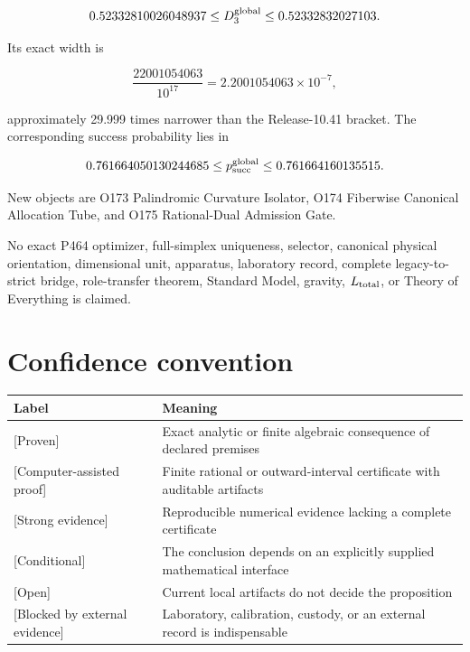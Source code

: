 \documentclass[11pt,a4paper,openany]{report}
\newcommand{\statusProven}{\textcolor{fingreen}{[Proven]}}
\newcommand{\statusStrong}{\textcolor{finblue}{[Strong evidence]}}
\begin{document}
\begin{enumerate}
\[
   0.52332810026048937\le D_3^{\rm global}
   \le0.52332832027103.
   \]

Its exact width is

\[
   \frac{22001054063}{10^{17}}=2.2001054063\times10^{-7},
   \]

approximately 29.999 times narrower than the Release-10.41 bracket. The corresponding success probability lies in

\[
   0.761664050130244685\le p_{\rm succ}^{\rm global}
   \le0.761664160135515.
   \]

\end{enumerate}

New objects are O173 Palindromic Curvature Isolator, O174 Fiberwise Canonical Allocation Tube, and O175 Rational-Dual Admission Gate.

No exact P464 optimizer, full-simplex uniqueness, selector, canonical physical orientation, dimensional unit, apparatus, laboratory record, complete legacy-to-strict bridge, role-transfer theorem, Standard Model, gravity, \(L_{\rm total}\), or Theory of Everything is claimed.

\chapter{Confidence convention}

\begin{center}
\begingroup\small
\setlength{\tabcolsep}{2.5pt}
\renewcommand{\arraystretch}{1.16}
\begin{longtable}{@{}p{}p{}@{}}
\toprule
\textbf{Label} & \textbf{Meaning} \\
\midrule
\endhead
\statusProven{} & Exact analytic or finite algebraic consequence of declared premises \\
\textcolor{fingreen}{[Computer-assisted proof]} & Finite rational or outward-interval certificate with auditable artifacts \\
\statusStrong{} & Reproducible numerical evidence lacking a complete certificate \\
\textcolor{finviolet}{[Conditional]} & The conclusion depends on an explicitly supplied mathematical interface \\
\textcolor{finorange}{[Open]} & Current local artifacts do not decide the proposition \\
\textcolor{finred}{[Blocked by external evidence]} & Laboratory, calibration, custody, or an external record is indispensable \\
\bottomrule
\end{longtable}
\endgroup
\end{center}
\end{document}

